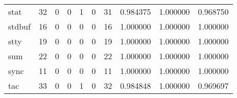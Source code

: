 \begin{longtable}{lrrrrrrrrr}
stat      &                                      32 &                                                  0 &                                                  0 &                                                  1 &                                                  0 &                                                 31 &                                           0.984375 &                               1.000000 &                             0.968750 \\
stdbuf    &                                      16 &                                                  0 &                                                  0 &                                                  0 &                                                  0 &                                                 16 &                                           1.000000 &                               1.000000 &                             1.000000 \\
stty      &                                      19 &                                                  0 &                                                  0 &                                                  0 &                                                  0 &                                                 19 &                                           1.000000 &                               1.000000 &                             1.000000 \\
sum       &                                      22 &                                                  0 &                                                  0 &                                                  0 &                                                  0 &                                                 22 &                                           1.000000 &                               1.000000 &                             1.000000 \\
sync      &                                      11 &                                                  0 &                                                  0 &                                                  0 &                                                  0 &                                                 11 &                                           1.000000 &                               1.000000 &                             1.000000 \\
tac       &                                      33 &                                                  0 &                                                  0 &                                                  1 &                                                  0 &                                                 32 &                                           0.984848 &                               1.000000 &                             0.969697 \\

\end{longtable}
